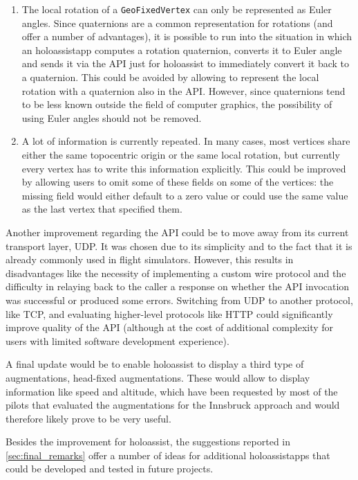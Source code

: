 \begin{enumerate}
    \item The local rotation of a \texttt{GeoFixedVertex} can only be represented as Euler angles. Since quaternions are a common representation for rotations (and offer a number of advantages), it is possible to run into the situation in which an \gls{holoassistapp} computes a rotation quaternion, converts it to Euler angle and sends it via the \gls{API} just for \gls{holoassist} to immediately convert it back to a quaternion. This could be avoided by allowing to represent the local rotation with a quaternion also in the \gls{API}. However, since quaternions tend to be less known outside the field of computer graphics, the possibility of using Euler angles should not be removed.
    \item A lot of information is currently repeated. In many cases, most vertices share either the same topocentric origin or the same local rotation, but currently every vertex has to write this information explicitly. This could be improved by allowing users to omit some of these fields on some of the vertices: the missing field would either default to a zero value or could use the same value as the last vertex that specified them.
\end{enumerate}

Another improvement regarding the \gls{API} could be to move away from its current transport layer, \gls{UDP}. It was chosen due to its simplicity and to the fact that it is already commonly used in flight simulators. However, this results in disadvantages like the necessity of implementing a custom wire protocol and the difficulty in relaying back to the caller a response on whether the \gls{API} invocation was successful or produced some errors. Switching from \gls{UDP} to another protocol, like TCP, and evaluating higher-level protocols like HTTP could significantly improve quality of the \gls{API} (although at the cost of additional complexity for users with limited software development experience).

A final update would be to enable \gls{holoassist} to display a third type of augmentations, head-fixed augmentations. These would allow to display information like speed and altitude, which have been requested by most of the pilots that evaluated the augmentations for the Innsbruck approach and would therefore likely prove to be very useful.

Besides the improvement for \gls{holoassist}, the suggestions reported in \autoref{sec:final_remarks} offer a number of ideas for additional \glspl{holoassistapp} that could be developed and tested in future projects.
